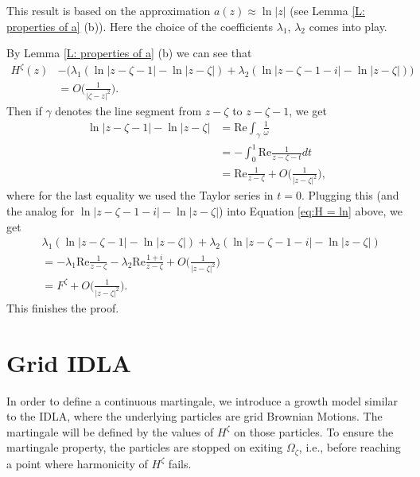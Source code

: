 \documentclass[11pt]{article}
\makeatletter
\renewenvironment{proof}[1][\proofname]{
   \par\pushQED{\qed}\normalfont
   \topsep6\p@\@plus6\p@\relax
   \trivlist\item[\hskip\labelsep\bfseries#1\@addpunct{.}]
   \ignorespaces
}{
   \popQED\endtrivlist\@endpefalse
}
\numberwithin{equation}{section}
\def\OZ{\Omega_{\zeta}}
\makeatother
\begin{document}
\begin{proof}[Proof of Lemma \ref{L: H close to F}]
  \renewcommand{\qedsymbol}{}
  This result is based on the approximation \hbox{$a(z) \approx \ln |z|$} 
  (see Lemma \ref{L: properties of a} (b)).
  Here the choice of the coefficients 
  $\lambda_1$, $\lambda_2$ comes into play.

  By Lemma \ref{L: properties of a} (b) 
  we can see that 
  \begin{equation}\label{eq:H = ln}
  \begin{split}
        H^{\zeta}(z)& - \big(\lambda_1 ( \ln |z-\zeta -1| -\ln |z-\zeta|)
                + \lambda_2 ( \ln |z-\zeta -1-i| -\ln |z-\zeta|) \big)\\
      &= O \bigg( \frac{1}{|\zeta - z|^2} \bigg).
    \end{split}
    \end{equation}
    Then if $\gamma$ denotes the 
    line segment from $z-\zeta$ to $z - \zeta -1$, we get
    \begin{equation}\nonumber
    \begin{split}
      \ln |z-\zeta -1| -\ln |z-\zeta|
    &= \text{Re} \int_{\gamma} \frac{1}{\omega}\\
    &= - \int_0^1 \text{Re} \frac{1}{z-\zeta-t} dt \\
    &= \text{Re} \frac{1}{z-\zeta} + 
        O\bigg( \frac{1}{|z - \zeta|^2} \bigg),
  \end{split}
  \end{equation}
  where for the last equality we used the Taylor series in $t=0$. 
  Plugging this (and the analog for $\ln |z-\zeta -1-i| -\ln |z-\zeta|$)
  into Equation \eqref{eq:H = ln} above, we get
  \begin{equation}\nonumber
    \begin{split}
    &\lambda_1 ( \ln |z-\zeta -1| -\ln |z-\zeta|)
    + \lambda_2 ( \ln |z-\zeta -1-i| -\ln |z-\zeta|) \\
    &= -\lambda_1 \text{Re} \frac{1}{z-\zeta} 
      -\lambda_2 \text{Re} \frac{1+i}{z-\zeta}  
      +  O\bigg( \frac{1}{|z - \zeta|^2} \bigg)\\
    &= F^{\zeta} + O\bigg( \frac{1}{|z - \zeta|^2} \bigg).
    \end{split}
  \end{equation} 
  This finishes the proof. 
\end{proof}


\section{Grid IDLA}
In order to define a continuous martingale, we introduce 
a growth model similar to the IDLA, where 
the underlying particles are grid Brownian Motions. 
The martingale will be defined by the values of 
$H^{\zeta}$ on those particles. To ensure the martingale 
property, the particles are stopped on 
exiting $\OZ$, i.e., before 
reaching a point where harmonicity of $H^{\zeta}$ fails.
\end{document}
